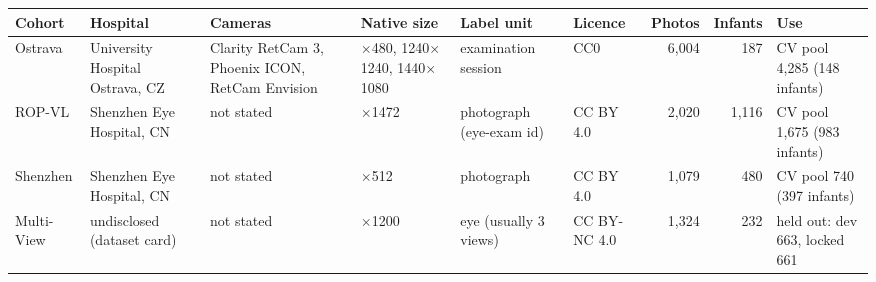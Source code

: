 \begin{tabular}{@{}l>{\raggedright\arraybackslash}p{2.3cm}>{\raggedright\arraybackslash}p{2.7cm}>{\raggedright\arraybackslash}p{2.0cm}>{\raggedright\arraybackslash}p{1.9cm}lrr>{\raggedright\arraybackslash}p{2.6cm}@{}}
\toprule
Cohort & Hospital & Cameras & Native size & Label unit & Licence & Photos & Infants & Use\\
\midrule
Ostrava & University Hospital Ostrava, CZ & Clarity RetCam 3, Phoenix ICON, RetCam Envision & 640$\times$480, 1240$\times$1240, 1440$\times$1080 & examination session & CC0 & 6{,}004 & 187 & CV pool 4{,}285 (148 infants) \\
ROP-VL & Shenzhen Eye Hospital, CN & not stated & 1472$\times$1472 & photograph (eye-exam id) & CC BY 4.0 & 2{,}020 & 1{,}116 & CV pool 1{,}675 (983 infants) \\
Shenzhen & Shenzhen Eye Hospital, CN & not stated & 512$\times$512 & photograph & CC BY 4.0 & 1{,}079 & 480 & CV pool 740 (397 infants) \\
Multi-View & undisclosed (dataset card) & not stated & 1600$\times$1200 & eye (usually 3 views) & CC BY-NC 4.0 & 1{,}324 & 232 & held out: dev 663, locked 661 \\
\bottomrule
\end{tabular}
